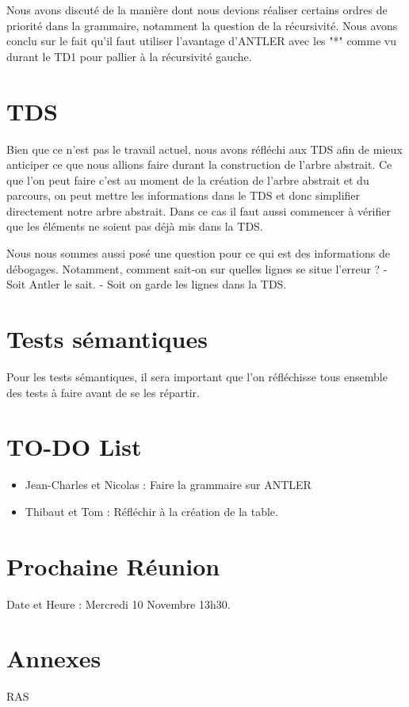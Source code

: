 \documentclass[french]{article}
\begin{document}
Nous avons discuté de la manière dont nous devions réaliser certains ordres de priorité dans la grammaire, notamment la question de la récursivité.
Nous avons conclu sur le fait qu'il faut utiliser l'avantage d'ANTLER avec les "*" comme vu durant le TD1 pour pallier à la récursivité gauche.


\section*{TDS}

Bien que ce n'est pas le travail actuel, nous avons réfléchi aux TDS afin de mieux anticiper ce que nous allions faire durant la construction de l'arbre abstrait.
Ce que l'on peut faire c'est au moment de la création de l'arbre abstrait et du parcours, on peut mettre les informations dans le TDS et donc simplifier directement notre arbre abstrait.
Dans ce cas il faut aussi commencer à vérifier que les éléments ne soient pas déjà mis dans la TDS.

Nous nous sommes aussi posé une question pour ce qui est des informations de débogages. Notamment, comment sait-on sur quelles lignes se situe l'erreur ? 
- Soit Antler le sait.
- Soit on garde les lignes dans la TDS.

\section*{Tests sémantiques}

Pour les tests sémantiques, il sera important que l'on réfléchisse tous ensemble des tests à faire avant de se les répartir.


\section*{TO-DO List}

\begin{itemize}
    \item Jean-Charles et Nicolas : Faire la grammaire sur ANTLER
    \item Thibaut et Tom : Réfléchir à la création de la table.
\end{itemize}


\section*{Prochaine Réunion}

Date et Heure : Mercredi 10 Novembre 13h30.

\section*{Annexes}
RAS
\end{document}
